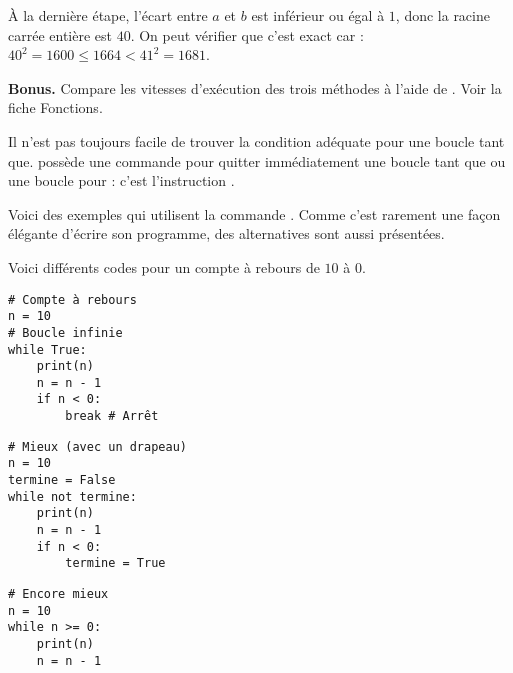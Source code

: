 \documentclass[11pt,class=report,crop=false]{standalone}
\begin{document}
\begin{activite}
\begin{enumerate}
\medskip

À la dernière étape, l'écart entre $a$ et $b$ est inférieur ou égal à $1$, donc la racine carrée entière est $40$. On peut vérifier que c'est exact car : $40^2 = 1600 \le 1664 < 41^2 = 1681$.
    
\end{enumerate}  
  
  
\textbf{Bonus.} Compare les vitesses d'exécution des trois méthodes à l'aide de . Voir la fiche \og{}Fonctions\fg{}.

\end{activite}

\begin{cours}

Il n'est pas toujours facile de trouver la condition adéquate pour une boucle \og{}tant que\fg{}. \Python{} possède une commande pour quitter immédiatement une boucle \og{}tant que\fg{}
ou une boucle \og{}pour\fg{} : c'est l'instruction 
.

Voici des exemples qui utilisent la commande . Comme c'est rarement une façon élégante d'écrire son programme, des alternatives sont aussi présentées.

\begin{exemple}

Voici différents codes pour un compte à rebours de $10$ à $0$.

\begin{minipage}{0.25\textwidth}
\begin{lstlisting}
# Compte à rebours
n = 10
# Boucle infinie
while True: 
    print(n)
    n = n - 1
    if n < 0:
        break # Arrêt
\end{lstlisting}
\end{minipage}\qquad\qquad
\begin{minipage}{0.4\textwidth}
\begin{lstlisting}
# Mieux (avec un drapeau)
n = 10
termine = False
while not termine:
    print(n)
    n = n - 1   
    if n < 0:
        termine = True
\end{lstlisting}
\end{minipage}
\begin{minipage}{0.2\textwidth}
\begin{lstlisting}
# Encore mieux
n = 10
while n >= 0:
    print(n)
    n = n - 1
\end{lstlisting}
\end{minipage}
\end{exemple}


\end{cours}
\end{document}
